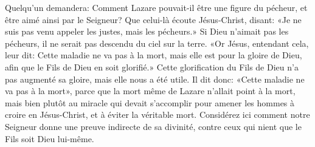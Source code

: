 Quelqu’un demandera: Comment Lazare pouvait-il être une figure du pécheur,
	et être aimé ainsi par le Seigneur?
Que celui-là écoute Jésus-Christ, disant:
	«Je ne suis pas venu appeler les justes, mais les pécheurs.»
Si Dieu n’aimait pas les pécheurs,
	il ne serait pas descendu du ciel sur la terre.
«Or Jésus, entendant cela, leur dit:
	Cette maladie ne va pas à la mort, mais elle est pour la gloire de Dieu,
	afin que le Fils de Dieu en soit glorifié.»
Cette glorification du Fils de Dieu n’a pas augmenté sa gloire,
	mais elle nous a été utile.
Il dit donc: «Cette maladie ne va pas à la mort»,
	parce que la mort même de Lazare n’allait point à la mort,
	mais bien plutôt au miracle qui devait s’accomplir
		pour amener les hommes à croire en Jésus-Christ,
	et à éviter la véritable mort.
Considérez ici comment notre Seigneur donne une preuve indirecte de sa divinité,
	contre ceux qui nient que le Fils soit Dieu lui-même.

